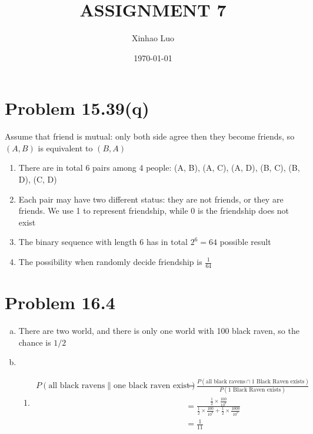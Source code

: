 \documentclass{article}
\title{\bf \Large ASSIGNMENT 7}
\author{Xinhao Luo}
\date{\today}
\def\math#1{$#1$}
\begin{document}
\maketitle
\medskip

\section{Problem 15.39(q)}
Assume that friend is mutual: only both side agree then they become friends, so \math{(A, B)} is equivalent to \math{(B, A)}

\begin{enumerate}
    \item There are in total 6 pairs among 4 people: (A, B), (A, C), (A, D), (B, C), (B, D), (C, D)
    \item Each pair may have two different status: they are not friends, or they are friends. We use 1 to represent friendship, while 0 is the friendship does not exist
    \item The binary sequence with length 6 has in total \math{2^6 = 64} possible result
    \item The possibility when randomly decide friendship is \math{\frac{1}{64}}
\end{enumerate}

\section{Problem 16.4}

\begin{enumerate}[a)]
    \item There are two world, and there is only one world with 100 black raven, so the chance is \math{1/2}
    \item 
    \begin{enumerate}
        \item \begin{equation}
            \begin{split}
                P(\text{all black ravens} \| \text{one black raven exist}) &= \frac{P(\text{all black ravens} \cap \text{1 Black Raven exists})}{P(\text{1 Black Raven exists})} \\
                &= \frac{\frac{1}{2} \times \frac{100}{10^6}}{\frac{1}{2} \times \frac{100}{10^6} + \frac{1}{2} \times \frac{1000}{10^6}} \\
                &= \frac{1}{11}
            \end{split}
        \end{equation} 
    \end{enumerate}
\end{enumerate}
\end{document}
